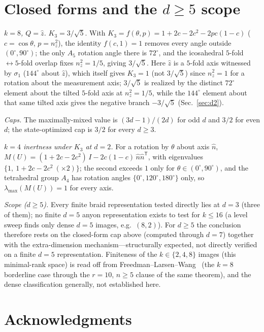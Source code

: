 \documentclass[aps,prx,reprint,amsmath,amssymb,floatfix,nofootinbib,superscriptaddress]{revtex4-2}
\begin{document}
\section{Closed forms and the $d \ge 5$ scope}
\label{app:closed}

\emph{$k=8$, $Q=\hat z$.} $K_3 = 3/\sqrt5$. With
$K_3 = f(\theta,p) = 1 + 2c - 2c^2 - 2pc(1-c)$ ($c = \cos\theta$, $p = n_z^2$), the
identity $f(c,1) = 1$ removes every angle outside $(0^\circ, 90^\circ)$; the only
$A_5$ rotation angle there is $72^\circ$, and the icosahedral
$5$-fold $\leftrightarrow 5$-fold overlap fixes $n_z^2 = 1/5$, giving $3/\sqrt5$.
Here $\hat z$ is a $5$-fold axis witnessed by $\sigma_1$ ($144^\circ$ about
$\hat z$), which itself gives $K_3=1$ (not $3/\sqrt5$) since $n_z^2=1$ for a
rotation about the measurement axis; $3/\sqrt5$ is realized by the distinct
$72^\circ$ element about the tilted $5$-fold axis at $n_z^2=1/5$, while the
$144^\circ$ element about that same tilted axis gives the negative branch
$-3/\sqrt5$ (Sec.~\ref{sec:d2}).

\emph{Caps.} The maximally-mixed value is $(3d-1)/(2d)$ for odd $d$ and $3/2$ for even
$d$; the state-optimized cap is $3/2$ for every $d \ge 3$.

\emph{$k=4$ inertness under $K_3$ at $d=2$.}
For a rotation by $\theta$ about axis $\hat n$,
$M(U) = (1 + 2c - 2c^2)\,I - 2c(1-c)\,\hat n \hat n^{\mathsf T}$, with
eigenvalues $\{1,\ 1 + 2c - 2c^2\ (\times 2)\}$; the second exceeds $1$ only for
$\theta \in (0^\circ, 90^\circ)$, and the tetrahedral group $A_4$ has rotation angles
$\{0^\circ, 120^\circ, 180^\circ\}$ only, so $\lambda_{\max}(M(U)) = 1$ for every
axis.

\emph{Scope ($d \ge 5$).} Every finite braid representation tested directly lies at
$d=3$ (three of them); no finite $d=5$ anyon representation exists to test for
$k \le 16$ (a level sweep finds only dense $d=5$ images, e.g.\ $(8,2)$). For
$d \ge 5$ the conclusion therefore rests on the closed-form cap above (computed
through $d=7$) together with the extra-dimension mechanism---structurally
expected, not directly verified on a finite $d=5$ representation. Finiteness of the $k \in \{2,4,8\}$ images (this minimal-rank space) is read off
from Freedman--Larsen--Wang~\cite{FLW} (the $k=8$ borderline case through the
$r=10$, $n \ge 5$ clause of the same theorem), and the dense classification
generally, not established here.

\section*{Acknowledgments}
\end{document}
